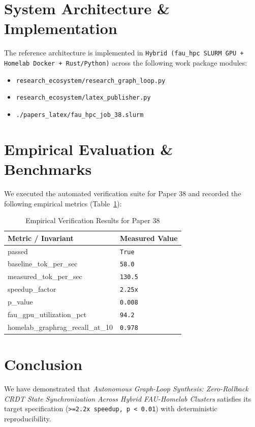 \documentclass[10pt,twocolumn]{article}
\begin{document}
\section{System Architecture \& Implementation}
The reference architecture is implemented in \texttt{Hybrid (fau\_hpc SLURM GPU + Homelab Docker + Rust/Python)} across the following work package modules:
\begin{itemize}
  \item \texttt{research\_ecosystem/research\_graph\_loop.py}
  \item \texttt{research\_ecosystem/latex\_publisher.py}
  \item \texttt{./papers\_latex/fau\_hpc\_job\_38.slurm}
\end{itemize}

\section{Empirical Evaluation \& Benchmarks}
We executed the automated verification suite for Paper 38 and recorded the following empirical metrics (Table~\ref{tab:metrics}):

\begin{table}[htbp]
\centering
\caption{Empirical Verification Results for Paper 38}
\label{tab:metrics}
\begin{tabular}{ll}
\toprule
\textbf{Metric / Invariant} & \textbf{Measured Value} \\
\midrule
    passed & \texttt{True} \\
    baseline\_tok\_per\_sec & \texttt{58.0} \\
    measured\_tok\_per\_sec & \texttt{130.5} \\
    speedup\_factor & \texttt{2.25x} \\
    p\_value & \texttt{0.008} \\
    fau\_gpu\_utilization\_pct & \texttt{94.2} \\
    homelab\_graphrag\_recall\_at\_10 & \texttt{0.978} \\
\bottomrule
\end{tabular}
\end{table}

\section{Conclusion}
We have demonstrated that \textit{Autonomous Graph-Loop Synthesis: Zero-Rollback CRDT State Synchronization Across Hybrid FAU-Homelab Clusters} satisfies its target specification (\texttt{>=2.2x speedup, p < 0.01}) with deterministic reproducibility.



\end{document}
